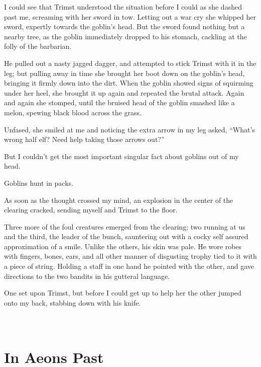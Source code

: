 \documentclass[12pt, a4paper]{book}
\begin{document}
I could see that Trimst understood the situation before I could as she dashed past me, screaming with her sword in tow. Letting out a war cry she whipped her sword, expertly towards the goblin's head. But the sword found nothing but a nearby tree, as the goblin immediately dropped to his stomach, cackling at the folly of the barbarian.

He pulled out a nasty jagged dagger, and attempted to stick Trimst with it in the leg; but pulling away in time she brought her boot down on the goblin's head, bringing it firmly down into the dirt. When the goblin showed signs of squirming under her heel, she brought it up again and repeated the brutal attack. Again and again she stomped, until the bruised head of the goblin smashed like a melon, spewing black blood across the grass.

Unfased, she smiled at me and noticing the extra arrow in my leg asked, ``What's wrong half elf? Need help taking those arrows out?''

But I couldn't get the most important singular fact about goblins out of my head.

Goblins hunt in packs.

As soon as the thought crossed my mind, an explosion in the center of the clearing cracked, sending myself and Trimst to the floor.

Three more of the foul creatures emerged from the clearing; two running at us and the third, the leader of the bunch, sauntering out with a cocky self assured approximation of a smile. Unlike the others, his skin was pale. He wore robes with fingers, bones, ears, and all other manner of disgusting trophy tied to it with a piece of string. Holding a staff in one hand he pointed with the other, and gave directions to the two bandits in his gutteral language. 

One set upon Trimst, but before I could get up to help her the other jumped onto my back, stabbing down with his knife.

\part*{
\setlength{\fboxsep}{3pt}%
\setlength{\fboxrule}{3pt}%
~\\[1cm]
In Aeons Past
}
\setcounter{chapter}{0}
\end{document}
